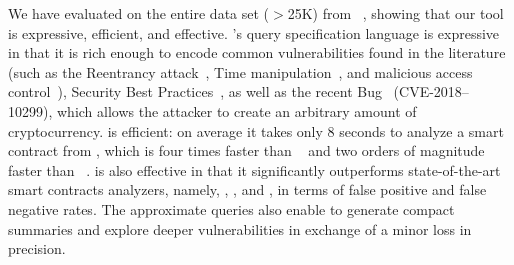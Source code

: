 We have evaluated \toolname on the entire data set ($>$25K) from
\etherscan~\cite{etherscan}, showing that our tool is expressive, efficient, and
effective. \toolname's query specification language is expressive in that it is
rich enough to encode common vulnerabilities found in the literature (such as the
Reentrancy attack~\cite{attack1}, Time manipulation~\cite{attack-time}, and
malicious access control~\cite{teether}), Security Best
Practices~\cite{best-practice}, as well as the recent \batchoverflow
Bug~\cite{attack-int} (CVE-2018–10299), which allows the attacker to create an
arbitrary amount of cryptocurrency. \toolname is efficient: on average it takes
only 8 seconds to analyze a smart contract from \etherscan, which is four times faster than \teether~\cite{teether} and two orders of magnitude
faster than \contractfuzz~\cite{contractfuzzer}. \toolname is also effective in
that it significantly outperforms state-of-the-art smart contracts
analyzers, namely, \teether, \mythril, and \contractfuzz, in terms of false positive and false negative rates. The approximate queries also enable \toolname to generate compact summaries and explore deeper vulnerabilities in exchange of a minor loss in precision.

